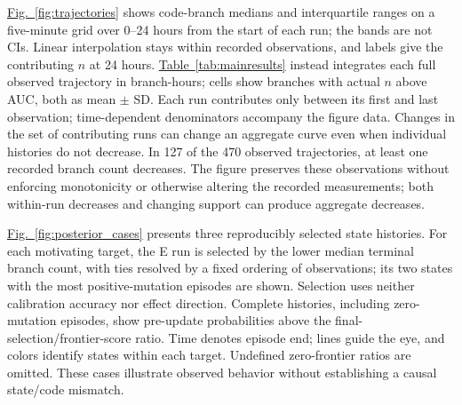 \documentclass[final,5p,times,number]{elsarticle}
\newcommand{\namedref}[2]{\hyperref[#2]{#1~\ref*{#2}}}
\newcommand{\figref}[1]{\namedref{Fig.}{#1}}
\begin{document}
\figref{fig:trajectories} shows code-branch medians and interquartile ranges on a five-minute grid over 0--24 hours from the start of each run; the bands are not CIs. Linear interpolation stays within recorded observations, and labels give the contributing $n$ at 24 hours. \namedref{Table}{tab:mainresults} instead integrates each full observed trajectory in branch-hours; cells show branches with actual $n$ above AUC, both as mean $\pm$ SD. Each run contributes only between its first and last observation; time-dependent denominators accompany the figure data. Changes in the set of contributing runs can change an aggregate curve even when individual histories do not decrease. In 127 of the 470 observed trajectories, at least one recorded branch count decreases. The figure preserves these observations without enforcing monotonicity or otherwise altering the recorded measurements; both within-run decreases and changing support can produce aggregate decreases.

\figref{fig:posterior_cases} presents three reproducibly selected state histories. For each motivating target, the E run is selected by the lower median terminal branch count, with ties resolved by a fixed ordering of observations; its two states with the most positive-mutation episodes are shown. Selection uses neither calibration accuracy nor effect direction. Complete histories, including zero-mutation episodes, show pre-update probabilities above the final-selection/frontier-score ratio. Time denotes episode end; lines guide the eye, and colors identify states within each target. Undefined zero-frontier ratios are omitted. These cases illustrate observed behavior without establishing a causal state/code mismatch.
\end{document}
